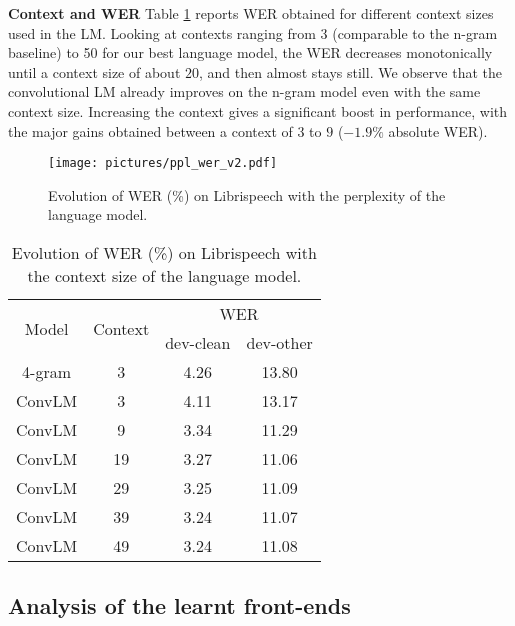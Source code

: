 \documentclass[a4paper]{article}
\begin{document}
{\bf Context and WER}
Table \ref{tab:context_wer} reports WER obtained for different context sizes used in the LM. Looking at contexts ranging from 3 (comparable to the n-gram baseline) to 50 for our best language model, the WER decreases monotonically until a context size of about $20$, and then almost stays still. We observe that the convolutional LM already improves on the n-gram model even with the same context size. Increasing the context gives a significant boost in performance, with the major gains obtained between a context of $3$ to $9$ ($-1.9\%$ absolute WER).

\begin{figure}[t]
  \texttt{[image: pictures/ppl\_wer\_v2.pdf]}
  \caption{Evolution of WER (\%) on Librispeech with the perplexity of the language model.}
  \label{fig:ppl_wer}
\end{figure}


\begin{table}[t]
    \centering
    \begin{tabular}{cccc}
    \toprule
    \multirow{2}{*}{Model} & \multirow{2}{*}{Context} & \multicolumn{2}{c}{WER} \\
    \cmidrule{3-4}
                       &                          & dev-clean  & dev-other  \\
    \midrule 
    4-gram      & 3              & 4.26 & 13.80  \\
    \midrule
    ConvLM     & 3             & 4.11 & 13.17 \\
    ConvLM     & 9             & 3.34 & 11.29 \\
    ConvLM     & 19             & 3.27 & 11.06 \\
    ConvLM     & 29             & 3.25 & 11.09 \\
    ConvLM     & 39             & 3.24 & 11.07 \\
    ConvLM     & 49             & 3.24 & 11.08 \\
    \bottomrule
    \end{tabular}
  \caption{Evolution of WER (\%) on Librispeech with the context size of the language model.}
  \label{tab:context_wer}
  \vspace{-5mm}
\end{table}


\subsection{Analysis of the learnt front-ends}
\end{document}
